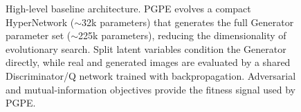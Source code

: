 \begin{figure}[t]
{
    }
    \caption{High-level baseline architecture. PGPE evolves a compact HyperNetwork ($\sim$32k parameters) that generates the full Generator parameter set ($\sim$225k parameters), reducing the dimensionality of evolutionary search. Split latent variables condition the Generator directly, while real and generated images are evaluated by a shared Discriminator/Q network trained with backpropagation. Adversarial and mutual-information objectives provide the fitness signal used by PGPE.}
    \label{fig:architecture}
\end{figure}
